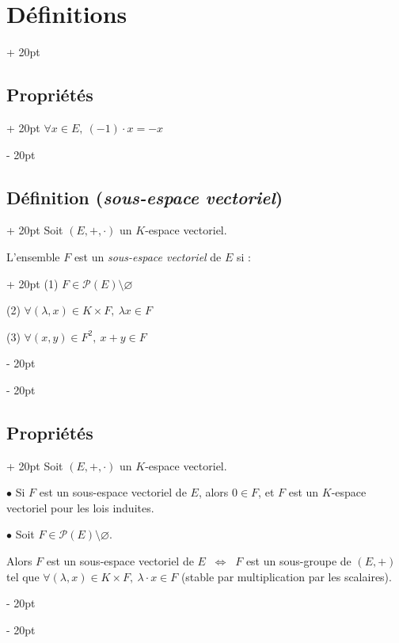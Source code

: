 \documentclass[a4paper, 12pt, twoside]{article}
\newcommand{\ssi}{\ \Leftrightarrow \ }
\newcommand{\ind}[1][20pt]{\advance\leftskip + #1}
\newcommand{\deind}[1][20pt]{\advance\leftskip - #1}
\newenvironment{indt}[2][20pt]{#2 \par \ind[#1]}{\par \deind} %
\begin{document}
\begin{indt}{\section{Définitions}}
\begin{indt}{\subsection{Propriétés}}
            $\forall x \in E,\ (-1) \cdot x = -x$
        \end{indt}
        
        \vspace{12pt}
        
        \begin{indt}{\subsection{Définition (\textit{sous-espace vectoriel})}}
            Soit $(E, +, \cdot)$ un $K$-espace vectoriel.
            
            \begin{indt}{L'ensemble $F$ est un \textit{sous-espace vectoriel} de $E$ si :}
                (1) $F \in \mathcal P(E) \setminus \varnothing$
                
                (2) $\forall (\lambda, x) \in K \times F,\ \lambda x \in F$
                
                (3) $\forall (x, y) \in F^2,\ x + y \in F$
            \end{indt}
        \end{indt}
            
        \vspace{12pt}
        
        \begin{indt}{\subsection{Propriétés}}
            Soit $(E, +, \cdot)$ un $K$-espace vectoriel.
            
            \vspace{6pt}
            
            $\bullet$ Si $F$ est un sous-espace vectoriel de $E$, alors $0 \in F$, et $F$ est un $K$-espace vectoriel pour les lois induites.
            
            \vspace{6pt}
            
            $\bullet$ Soit $F \in \mathcal P(E) \setminus \varnothing$.
            
            Alors $F$ est un sous-espace vectoriel de $E$ $\ssi$ $F$ est un sous-groupe de $(E, +)$ tel que $\forall (\lambda, x) \in K \times F,\ \lambda \cdot x \in F$ (stable par multiplication par les scalaires).
            
            \vspace{12pt}
            

\end{indt}
\end{indt}
\end{document}
